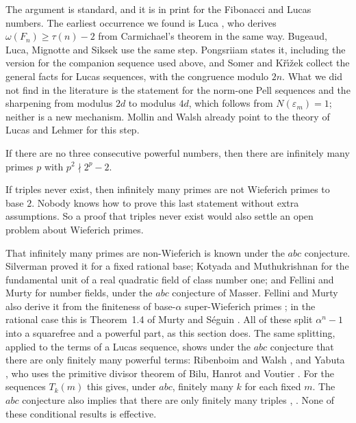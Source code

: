 The argument is standard, and it is in print for the Fibonacci and Lucas numbers. The earliest occurrence we found is Luca
\cite[p.~267]{Luca1999}, who derives $\omega(F_n) \ge \tau(n) - 2$ from Carmichael's theorem in the same way. Bugeaud, Luca, Mignotte and
Siksek \cite[proof of Theorem~5]{BugeaudLucaMignotteSiksek2005} use the same step. Pongsriiam \cite[Lemmas~2.5(i) and
3.4(i)]{Pongsriiam2019} states it, including the version for the companion sequence used above, and Somer and K{\v{r}}{\'{\i}}{\v{z}}ek
\cite[Lemma~2.7]{SomerKrizek2015} collect the general facts for Lucas sequences, with the congruence modulo $2n$. What we did not find in
the literature is the statement for the norm-one Pell sequences and the sharpening from modulus $2d$ to modulus $4d$, which follows from
$N(\varepsilon_m) = 1$; neither is a new mechanism. Mollin and Walsh \cite[p.~111]{MollinWalsh1986a} already point to the theory of Lucas
and Lehmer \cite{Lucas1878,Lehmer1930} for this step.

\begin{theorem}
If there are no three consecutive powerful numbers, then there are infinitely many primes $p$ with $p^2 \nmid 2^p - 2$.
\end{theorem}

\inwords If triples never exist, then infinitely many primes are not Wieferich primes to base $2$. Nobody knows how to prove this last
statement without extra assumptions. So a proof that triples never exist would also settle an open problem about Wieferich primes.

That infinitely many primes are non-Wieferich is known under the $abc$ conjecture. Silverman \cite[Theorem~1]{Silverman1988} proved it for a fixed
rational base; Kotyada and Muthukrishnan \cite[Theorem~1.1]{KotyadaMuthukrishnan2018} for the fundamental unit of a real quadratic field
of class number one; and Fellini and Murty \cite[Theorem~1.2]{FelliniMurty2026} for number fields, under the $abc$ conjecture of Masser.
Fellini and Murty also derive it from the finiteness of base-$\alpha$ super-Wieferich primes \cite[Theorem~1.3]{FelliniMurty2026}; in the
rational case this is Theorem~1.4 of Murty and S{\'e}guin \cite{MurtySeguin2019}. All of these split $\alpha^n - 1$ into a squarefree and a
powerful part, as this section does. The same splitting, applied to the terms of a Lucas sequence, shows under the $abc$ conjecture that
there are only finitely many powerful terms: Ribenboim and Walsh \cite[Corollary~2]{RibenboimWalsh1999}, and Yabuta \cite[Theorem~2.3]{Yabuta2007}, who
uses the primitive divisor theorem of Bilu, Hanrot and Voutier \cite{BiluHanrotVoutier2001}. For the sequences $T_k(m)$ this gives, under $abc$,
finitely many $k$ for each fixed $m$. The $abc$ conjecture also implies that there are only finitely many triples
\cite[Section~6]{AktasMurty2017}, \cite[Section~1]{Tao2026}. None of these conditional results is effective.

